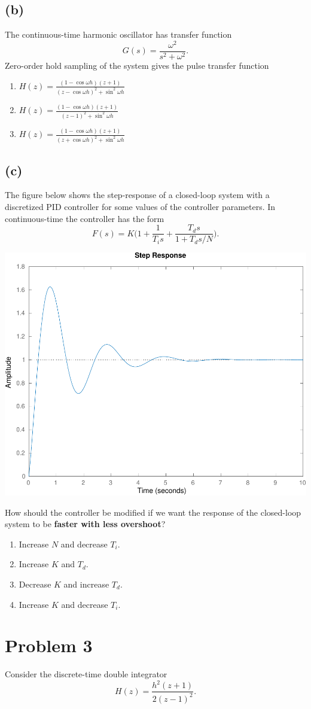 \documentclass{scrartcl}
\begin{document}
\subsection*{(b)}
\label{sec:orgheadline3}
The continuous-time harmonic oscillator has transfer function
\[ G(s) = \frac{\omega^2}{s^2 + \omega^2}. \]
Zero-order hold sampling of the system gives the pulse transfer function
\begin{enumerate}
\item \(H(z) = \frac{(1-\cos\omega h)(z+1)}{(z-\cos \omega h)^2 + \sin^2 \omega h}\)
\item \(H(z) = \frac{(1-\cos\omega h)(z+1)}{(z-1)^2 + \sin^2 \omega h}\)
\item \(H(z) = \frac{(1-\cos\omega h)(z+1)}{(z+\cos \omega h)^2 + \sin^2 \omega h}\)
\end{enumerate}

\subsection*{(c)}
\label{sec:orgheadline4}
The figure below shows the step-response of a closed-loop system with a discretized PID controller for some values of the controller parameters. In continuous-time the controller has the form
 \[ F(s) = K\Big(1 + \frac{1}{T_i s} + \frac{T_ds}{1 + T_ds/N}\Big). \]
\begin{center}
\includegraphics[width=0.4\linewidth]{tuned-response}
\end{center}
How should the controller be modified if we want the response of the closed-loop system to be \textbf{faster with less overshoot}?
\begin{enumerate}
\item Increase \(N\) and decrease \(T_i\).
\item Increase \(K\) and \(T_d\).
\item Decrease \(K\) and increase \(T_d\).
\item Increase \(K\) and decrease \(T_i\).
\end{enumerate}


\section*{Problem 3}
\label{sec:orgheadline8}
Consider the discrete-time double integrator
\[ H(z) = \frac{h^2(z+1)}{2(z-1)^2}. \]
\end{document}

